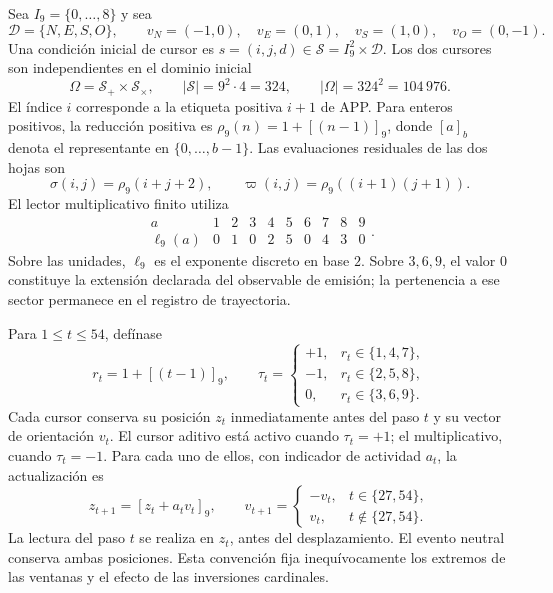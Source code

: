 Sea $I_9=\{0,\ldots,8\}$ y sea
\[
 \mathcal D=\{N,E,S,O\},\qquad
 v_N=(-1,0),\quad v_E=(0,1),\quad
 v_S=(1,0),\quad v_O=(0,-1).
\]
Una condición inicial de cursor es $s=(i,j,d)\in
\mathcal S=I_9^2\times\mathcal D$. Los dos cursores son independientes
en el dominio inicial
\begin{equation}
 \Omega=\mathcal S_+\times\mathcal S_\times,
 \qquad |\mathcal S|=9^2\cdot4=324,
 \qquad |\Omega|=324^2=104\,976.
 \label{iii:iii:nf-dominio}
\end{equation}
El índice $i$ corresponde a la etiqueta positiva $i+1$ de APP. Para
enteros positivos, la reducción positiva es $\rho_9(n)=1+[(n-1)]_9$,
donde $[a]_b$ denota el representante en $\{0,\ldots,b-1\}$.
Las evaluaciones residuales de las dos hojas son
\[
 \sigma(i,j)=\rho_9(i+j+2),\qquad
 \varpi(i,j)=\rho_9((i+1)(j+1)).
\]
El lector multiplicativo finito utiliza
\begin{equation}
 \begin{array}{c|rrrrrrrrr}
 a&1&2&3&4&5&6&7&8&9\\ \hline
 \ell_9(a)&0&1&0&2&5&0&4&3&0
 \end{array}.
 \label{iii:iii:nf-log}
\end{equation}
Sobre las unidades, $\ell_9$ es el exponente discreto en base $2$.
Sobre $3,6,9$, el valor $0$ constituye la extensión declarada del
observable de emisión; la pertenencia a ese sector permanece en el
registro de trayectoria.

Para $1\le t\le54$, defínase
\[
 r_t=1+[(t-1)]_9,
 \qquad
 \tau_t=
 \begin{cases}
 +1,&r_t\in\{1,4,7\},\\
 -1,&r_t\in\{2,5,8\},\\
 0,&r_t\in\{3,6,9\}.
 \end{cases}
\]
Cada cursor conserva su posición $z_t$ inmediatamente antes del paso
$t$ y su vector de orientación $v_t$. El cursor aditivo está activo
cuando $\tau_t=+1$; el multiplicativo, cuando $\tau_t=-1$. Para cada
uno de ellos, con indicador de actividad $a_t$, la actualización es
\begin{equation}
 z_{t+1}=[z_t+a_tv_t]_9,
 \qquad
 v_{t+1}=
 \begin{cases}
 -v_t,&t\in\{27,54\},\\
 v_t,&t\notin\{27,54\}.
 \end{cases}
 \label{iii:iii:nf-actualizacion}
\end{equation}
La lectura del paso $t$ se realiza en $z_t$, antes del desplazamiento.
El evento neutral conserva ambas posiciones. Esta convención fija
inequívocamente los extremos de las ventanas y el efecto de las
inversiones cardinales.

